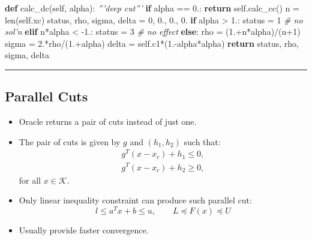 \documentclass[]{article}
\newenvironment{Shaded}{}{}
\newcommand{\BuiltInTok}[1]{#1}
\newcommand{\CommentTok}[1]{\textcolor[rgb]{0.38,0.63,0.69}{\textit{#1}}}
\newcommand{\ControlFlowTok}[1]{\textcolor[rgb]{0.00,0.44,0.13}{\textbf{#1}}}
\newcommand{\DecValTok}[1]{\textcolor[rgb]{0.25,0.63,0.44}{#1}}
\newcommand{\FloatTok}[1]{\textcolor[rgb]{0.25,0.63,0.44}{#1}}
\newcommand{\KeywordTok}[1]{\textcolor[rgb]{0.00,0.44,0.13}{\textbf{#1}}}
\newcommand{\NormalTok}[1]{#1}
\newcommand{\OperatorTok}[1]{\textcolor[rgb]{0.40,0.40,0.40}{#1}}
\newcommand{\VariableTok}[1]{\textcolor[rgb]{0.10,0.09,0.49}{#1}}
\begin{document}
\begin{Shaded}
\begin{Highlighting}[]
    \KeywordTok{def}\NormalTok{ calc_dc(}\VariableTok{self}\NormalTok{, alpha):}
        \CommentTok{'''deep cut'''}
        \ControlFlowTok{if}\NormalTok{ alpha }\OperatorTok{==} \FloatTok{0.}\NormalTok{: }
            \ControlFlowTok{return} \VariableTok{self}\NormalTok{.calc_cc()}
\NormalTok{        n }\OperatorTok{=} \BuiltInTok{len}\NormalTok{(}\VariableTok{self}\NormalTok{.xc)}
\NormalTok{        status, rho, sigma, delta }\OperatorTok{=} \DecValTok{0}\NormalTok{, }\FloatTok{0.}\NormalTok{, }\FloatTok{0.}\NormalTok{, }\FloatTok{0.}
        \ControlFlowTok{if}\NormalTok{ alpha }\OperatorTok{>} \FloatTok{1.}\NormalTok{:}
\NormalTok{            status }\OperatorTok{=} \DecValTok{1}  \CommentTok{# no sol'n}
        \ControlFlowTok{elif}\NormalTok{ n}\OperatorTok{*}\NormalTok{alpha }\OperatorTok{<} \FloatTok{-1.}\NormalTok{:}
\NormalTok{            status }\OperatorTok{=} \DecValTok{3}  \CommentTok{# no effect}
        \ControlFlowTok{else}\NormalTok{:}
\NormalTok{            rho }\OperatorTok{=}\NormalTok{ (}\FloatTok{1.}\OperatorTok{+}\NormalTok{n}\OperatorTok{*}\NormalTok{alpha)}\OperatorTok{/}\NormalTok{(n}\OperatorTok{+}\DecValTok{1}\NormalTok{)}
\NormalTok{            sigma }\OperatorTok{=} \FloatTok{2.}\OperatorTok{*}\NormalTok{rho}\OperatorTok{/}\NormalTok{(}\FloatTok{1.}\OperatorTok{+}\NormalTok{alpha)}
\NormalTok{            delta }\OperatorTok{=} \VariableTok{self}\NormalTok{.c1}\OperatorTok{*}\NormalTok{(}\FloatTok{1.}\OperatorTok{-}\NormalTok{alpha}\OperatorTok{*}\NormalTok{alpha)}
        \ControlFlowTok{return}\NormalTok{ status, rho, sigma, delta}
\end{Highlighting}
\end{Shaded}

\begin{center}\rule{0.5\linewidth}{\linethickness}\end{center}

\hypertarget{parallel-cuts}{%
\subsection{Parallel Cuts}\label{parallel-cuts}}

\begin{itemize}
\item
  Oracle returns a pair of cuts instead of just one.
\item
  The pair of cuts is given by \(g\) and \((h_1, h_2)\) such that:
  \[\begin{array}{l}
  g^T (x - x_c) + h_1 \leq 0,  \\
  g^T (x - x_c) + h_2 \geq 0,
  \end{array}\] for all \(x \in \mathcal{K}\).
\item
  Only linear inequality constraint can produce such parallel cut:
  \[ l \leq a^T x + b \leq u, \qquad L \preceq F(x) \preceq U \]
\item
  Usually provide faster convergence.
\end{itemize}
\end{document}

